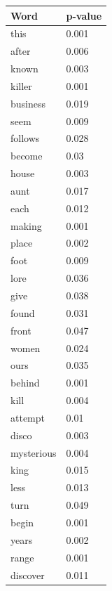 \documentclass[12pt, oneside]{article}   	%
\begin{document}
\begin{table}[H]
\begin{tabular}[t]{l|l}
\textbf{Word}        & \textbf{p-value} \\ \hline
this        & 0.001    \\
after       & 0.006    \\
known       & 0.003    \\
killer      & 0.001    \\
business    & 0.019    \\
seem        & 0.009    \\
follows     & 0.028    \\
become      & 0.03     \\
house       & 0.003    \\
aunt        & 0.017    \\
each        & 0.012    \\
making      & 0.001    \\
place       & 0.002    \\
foot        & 0.009    \\
lore        & 0.036    \\
give        & 0.038    \\
found       & 0.031    \\
front       & 0.047    \\
women       & 0.024    \\
ours        & 0.035    \\
behind      & 0.001    \\
kill        & 0.004    \\
attempt     & 0.01     \\
disco       & 0.003    \\
mysterious  & 0.004    \\
king        & 0.015    \\
less        & 0.013    \\
turn        & 0.049    \\
begin       & 0.001    \\
years       & 0.002    \\
range       & 0.001    \\
discover    & 0.011    \\

\end{tabular}
\end{table}
\end{document}
